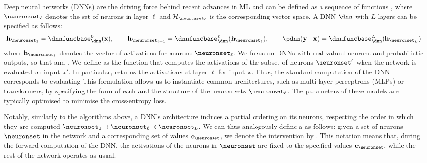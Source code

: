 \documentclass{article}
\newcommand{\bx}{\mathbf{x}}
\newcommand{\calX}{\mathcal{X}}
\newcommand{\by}{\mathbf{y}}
\newcommand{\calY}{\mathcal{Y}}
\newcommand{\R}{\mathbb{R}}
\newcommand{\hiddenspace}{\mathcal{H}}
\newcommand{\dnnfunclayer}[1]{\dnnfuncbase_{\dnn}^{#1}}
\newcommand{\layer}{\ell}
\newcommand{\hiddenstates}{\mathbf{h}}
\newcommand{\nlayers}{L}
\begin{document}
\newcommand{\layerdim}[1]{\lvert \neuronset_{#1} \rvert}
\newcommand{\bxdata}{\bx^{(n)}}
\newcommand{\bydata}{\by^{(n)}}
Deep neural networks (DNNs) are the driving force behind recent advances in ML and can be defined as a sequence of functions \smash{$\dnnfunclayer{\layer}: \hiddenspace_{\neuronset_{\layer}} \to \hiddenspace_{\neuronset_{\layer+1}}$}, where $\neuronset_{\layer}$ denotes the set of neurons in layer $\layer$ and $\hiddenspace_{\neuronset_{\layer}}$ is the corresponding vector space. 
A DNN $\dnn$ with $\nlayers$ layers can be specified as follows:
\begin{align}
    \hiddenstates_{\neuronset_{1}} = \dnnfunclayer{0}(\bx), \qquad
    \hiddenstates_{\neuronset_{\layer+1}} = \dnnfunclayer{\layer}(\hiddenstates_{\neuronset_{\layer}}), \qquad
    \pdnn(\by \mid \bx) = \dnnfunclayer{\nlayers}(\hiddenstates_{\neuronset_{\nlayers}})
\end{align}
where $\hiddenstates_{\neuronset_{\layer}}$ denotes the vector of activations for neurons $\neuronset_{\layer}$. 
We focus on DNNs with real-valued neurons and probabilistic outputs, so that \smash{$\hiddenspace_{\neuronset_{0}} = \calX$, $\hiddenspace_{\neuronset_{\ell}} = \R^{\layerdim{\ell}}$} and \smash{$\hiddenspace_{\neuronset_{\nlayers+1}} = \Delta^{|\calY|-1}$}.
We define \smash{$\dnnfunclayer{\neuronset'}(\bx')$} as the function that computes the activations of the subset of neurons $\neuronset'$ when the network is evaluated on input $\bx'$. In particular, \smash{$\dnnfunclayer{\neuronset_{\layer}}(\bx)$} returns the activations at layer $\layer$ for input $\bx$. Thus, the standard computation of the DNN corresponds to evaluating \smash{$\pdnn(\by \mid \bx) = \dnnfunclayer{\neuronset_{\nlayers+1}}(\bx)$.}
This formulation allows us to instantiate common architectures, such as multi-layer perceptrons (MLPs) or transformers, by specifying the form of each \smash{$\dnnfunclayer{\layer}$} and the structure of the neuron sets $\neuronset_{\layer}$.
The parameters of these models are typically optimised to minimise the cross-entropy loss.

Notably, similarly to the algorithms above, a DNN's architecture induces a partial ordering on its neurons, respecting the order in which they are computed $\neuronset_{0} \partialsmall \neuronset_{\layer} \partialsmall \neuronset_{\nlayers}$.
We can thus analogously define a  as follows:
given a set of neurons $\neuronset$ in the network and a corresponding set of values $\constants_{\neuronset}$, we denote the intervention by
\smash{$\dnnfunclayer{\neuronset_{\nlayers\!+\!1}}\big(\bx,\, (\hiddenstates_{\neuronset} \leftarrow \constants_{\neuronset})\big)$}.
This notation means that, during the forward computation of the DNN, the activations of the neurons in $\neuronset$ are fixed to the specified values $\constants_{\neuronset}$, while the rest of the network operates as usual.
\end{document}
